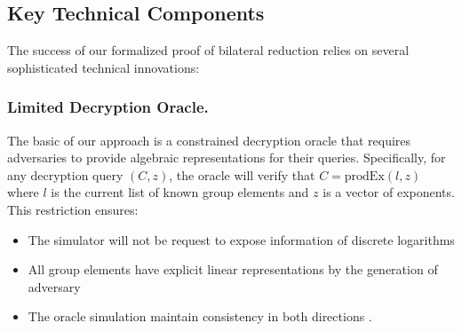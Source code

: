 








\subsection{Key Technical Components}

The success of our formalized proof of bilateral reduction relies on several sophisticated technical innovations:

\subsubsection{Limited Decryption Oracle.} The basic of our approach is a constrained decryption oracle that requires adversaries to provide algebraic representations for their queries. Specifically, for any decryption query $(C, z)$, the oracle will verify that $C = \text{prodEx}(l, z)$ where $l$ is the current list of known group elements and $z$ is a vector of exponents. This restriction ensures:
\begin{itemize}
\item The simulator will not be request to expose information of discrete logarithms
\item All group elements have explicit linear representations by the generation of adversary 
\item The oracle simulation maintain consistency in both directions . 
\end{itemize}

